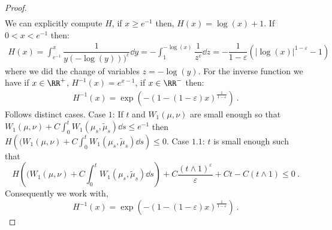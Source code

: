 \begin{proof}
\begin{align*}
     \end{align*}
     We can explicitly compute $H$, if $x \geq e^{-1}$ then, $H(x) = \log(x) + 1$. If $0< x < e^{-1}$ then:
     \begin{align*}
         H(x) = \int_{e^{-1}}^x \dfrac{1}{y(-\log(y)))^\varepsilon}\dd y = -\int_{1}^{-\log(x)} \dfrac{1}{z^\varepsilon}\dd z =- \dfrac{1}{1 - \varepsilon} (|\log(x)|^{1-\varepsilon} -1)\,
     \end{align*}
     where we did the change of variables $z = -\log(y)$. For the inverse function we have if $x \in \RR^+$, $H^{-1}(x) = e^{x - 1}$, if $x \in \RR^{-}$ then:
     \begin{align*}
         H^{-1}(x) = \exp\left(-(1 - (1-\varepsilon)x)^{\frac{1}{1-\varepsilon}} \right)\ .
     \end{align*}
     Follows distinct cases. Case $1$: If $t$ and $W_1(\mu,\nu)$ are small enough so that $W_1(\mu, \nu) + C\int_0^t W_1(\mu_s,\tilde{\mu}_s) \dd s \leq e^{-1}$ then $H\left((W_1(\mu, \nu) + C\int_0^t W_1(\mu_s,\tilde{\mu}_s) \dd s\right) \leq 0$. Case $1.1$: $t$ is small enough such that 
     \[H\left((W_1(\mu, \nu) + C\int_0^t W_1(\mu_s,\tilde{\mu}_s) \dd s\right) + C\dfrac{(t\wedge 1)^\varepsilon}{\varepsilon} + Ct-C(t\wedge 1) \leq 0\ .\]
     Consequently we work with,
     \[ H^{-1}(x) = \exp\left(-(1 - (1-\varepsilon)x)^{\frac{1}{1-\varepsilon}} \right)\ .\]
\end{proof}